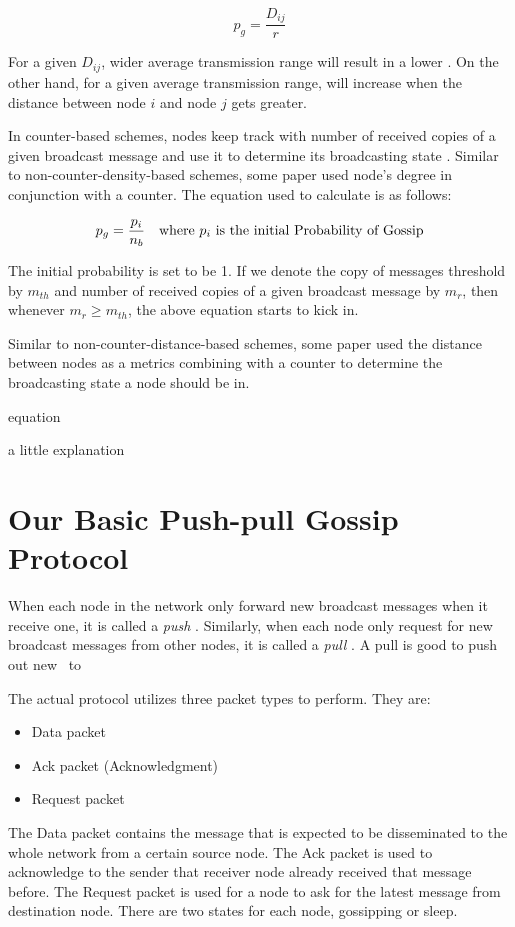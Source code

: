 \[ p_g = \frac{D_{ij}}{r}\]

For a given $D_{ij}$, wider average transmission range will result in a lower \emph{\pog}. On the other hand, for a given average transmission range, \emph{\pog} will increase when the distance between node $i$ and node $j$ gets greater.

In counter-based schemes, nodes keep track with number of received copies of a given broadcast message and use it to determine its broadcasting state \cite{2015survey}. Similar to non-counter-density-based schemes, some paper \cite{lee2010adaptive} used node's degree in conjunction with a counter. The equation used to calculate \emph{\pog} is as follows:

\[ p_g = \frac{p_i}{n_b} \quad \mbox{where } p_i \mbox{ is the initial Probability of Gossip}\]

The initial probability is set to be 1. If we denote the copy of messages threshold by $m_{th}$ and number of received copies of a given broadcast message by $m_r$, then whenever $m_r \geq m_{th}$, the above equation starts to kick in.

Similar to non-counter-distance-based schemes, some paper \cite{} used the distance between nodes as a metrics combining with a counter to determine the broadcasting state a node should be in. 

equation

a little explanation


\section{Our Basic Push-pull Gossip Protocol}
When each node in the network only forward new broadcast messages when it receive one, it is called a \emph{push} \gp. Similarly, when each node only request for new broadcast messages from other nodes, it is called  a \emph{pull} \gp. A pull \gp is good to push out new \msgs ~to 

The actual protocol utilizes three packet types to perform. They are:
\begin{itemize}
	\item Data packet
	\item Ack packet  (Acknowledgment)
	\item Request packet
\end{itemize}

The Data packet contains the message that is expected to be disseminated to the whole network from a certain source node. The Ack packet is used to acknowledge to the sender that receiver node already received that message before. The Request packet is used for a node to ask for the latest message from destination node. There are two states for each node, gossipping or sleep.


